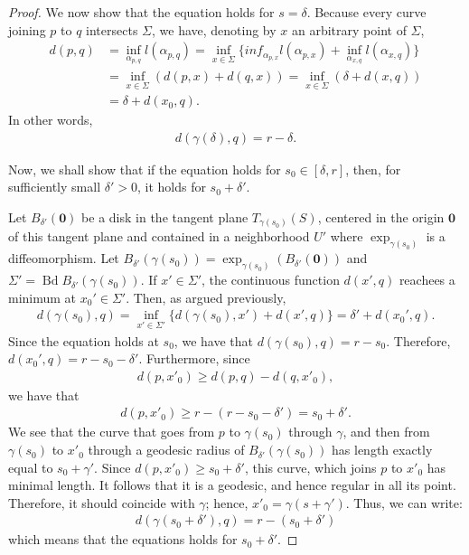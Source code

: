 \documentclass[10pt]{article}
\newcommand{\ve}[1]{\mathbf{#1}}
\DeclareMathOperator{\Bd}{Bd}
\begin{document}
\begin{itemize}
\begin{proof}
      We now show that the equation holds for $s = \delta$. Because every curve joining $p$ to $q$ intersects $\Sigma$, we have, denoting by $x$ an arbitrary point of $\Sigma$,
      \begin{align*}
        d(p,q)
        &= \inf_{\alpha_{p,q}} l(\alpha_{p,q}) 
        = \inf_{x\in \Sigma} \{ inf_{\alpha_{p,x}} l(\alpha_{p,x}) + \inf_{\alpha_{x,q}} l(\alpha_{x,q}) \}\\
        &= \inf_{x \in \Sigma} (d(p,x) + d(q,x)) = \inf_{x \in \Sigma} (\delta + d(x,q))\\
        &= \delta + d(x_0, q).
      \end{align*}
      In other words,
      \begin{align*}
        d(\gamma(\delta), q) = r - \delta.
      \end{align*}

       Now, we shall show that if the equation holds for $s_0 \in [\delta, r]$, then, for sufficiently small $\delta' > 0$, it holds for $s_0 + \delta'$.

       Let $B_{\delta'}(\ve{0})$ be a disk in the tangent plane $T_{\gamma(s_0)}(S)$, centered in the origin $\ve{0}$ of this tangent plane and contained in a neighborhood $U'$ where $\exp_{\gamma(s_0)}$ is a diffeomorphism. Let $B_{\delta'}(\gamma(s_0)) = \exp_{\gamma(s_0)}(B_{\delta'}(\ve{0}))$ and $\Sigma' = \Bd B_{\delta'}(\gamma(s_0))$. If $x' \in \Sigma'$, the continuous function $d(x',q)$ reachees a minimum at $x_0' \in \Sigma'$. Then, as argued previously,
       \begin{align*}
         d(\gamma(s_0),q) = \inf_{x' \in \Sigma'} \{ d(\gamma(s_0), x') + d(x', q) \} = \delta' + d(x_0', q).
       \end{align*}
       Since the equation holds at $s_0$, we have that $d(\gamma(s_0), q) = r - s_0$. Therefore, $d(x_0', q) = r - s_0 - \delta'$. Furthermore, since
       \begin{align*}
         d(p,x'_0) \geq d(p,q) - d(q,x'_0),
       \end{align*}
       we have that
       \begin{align*}
         d(p,x'_0) \geq r - (r - s_0 - \delta') = s_0 + \delta'.
       \end{align*}
       We see that the curve that goes from $p$ to $\gamma(s_0)$ through $\gamma$, and then from $\gamma(s_0)$ to $x'_0$ through a geodesic radius of $B_{\delta'}(\gamma(s_0))$ has length exactly equal to $s_0 + \gamma'$. Since $d(p,x'_0) \geq s_0 + \delta'$, this curve, which joins $p$ to $x'_0$ has minimal length. It follows that it is a geodesic, and hence regular in all its point. Therefore, it should coincide with $\gamma$; hence, $x'_0 = \gamma(s + \gamma')$. Thus, we can write:
       \begin{align*}
         d(\gamma(s_0 + \delta'), q) = r - (s_0 + \delta')
       \end{align*}
       which means that the equations holds for $s_0 + \delta'$.
    \end{proof}


\end{itemize}
\end{document}
